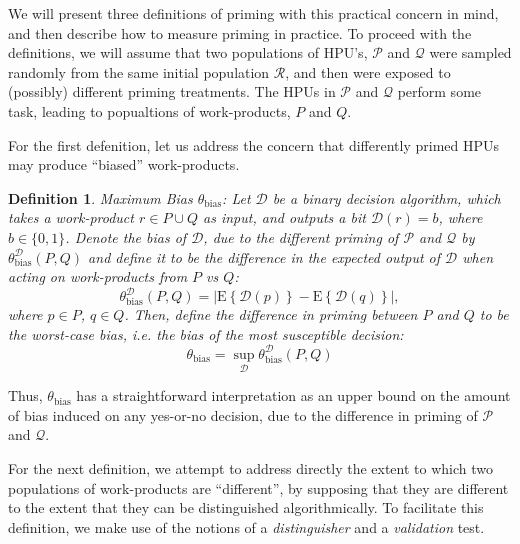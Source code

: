 \documentclass[12pt]{article}
\newtheorem*{mydef}{Definition}
\begin{document}
We will present three definitions of priming with this practical concern in 
mind, and then describe how to measure priming in practice. To proceed with 
the definitions, we will assume that two populations of HPU’s, $\mathcal{P}$ 
and $\mathcal{Q}$ were 
sampled randomly from the same initial population $\mathcal{R}$, and then were 
exposed to (possibly) different priming treatments. The HPUs in $\mathcal{P}$ 
and $\mathcal{Q}$ perform some 
task, leading to popualtions of work-products, $P$ and $Q$.

For the first defenition, let us address the concern that differently primed 
HPUs may produce ``biased'' work-products.

\begin{mydef}
	{\upshape Maximum Bias $\theta_\mathrm{bias}$:}
	Let $\mathcal{D}$ be a binary decision algorithm, which takes a 
	work-product
	$r \in P \cup Q$ as input, and outputs a bit $\mathcal{D}(r)=b$, where 
	$b \in \{0,1\}$. Denote the \emph{bias} of $\mathcal{D}$, due to the
	different priming of $\mathcal{P}$ and $\mathcal{Q}$ by
	$\theta^\mathcal{D}_\mathrm{bias}(P,Q)$ and define it to be the difference 
	in the expected output of $\mathcal{D}$ when acting on work-products from 
	$P$ vs $Q$:
	$$
	\theta^\mathcal{D}_\mathrm{bias}(P,Q) = 
		\left| 
			\mathrm{E}\left\{ \mathcal{D}(p) \right\} 
			- \mathrm{E}\left\{ \mathcal{D}(q) \right\} 
		\right|,
	$$
	where $p \in P$, $q \in Q$.  Then, define the difference in priming 
	between $P$ and $Q$ to be the worst-case bias, i.e. the bias of the most
	susceptible decision:
	$$
	\theta_\mathrm{bias} = 
		\sup_\mathcal{D} \theta^\mathcal{D}_\mathrm{bias}(P,Q)
	$$
\end{mydef}


Thus, $\theta_\mathrm{bias}$ has a straightforward interpretation as an upper 
bound on the amount of bias induced on any yes-or-no decision, due to the 
difference in priming of $\mathcal{P}$ and $\mathcal{Q}$.

For the next definition, we attempt to address directly the extent to which 
two populations of work-products are ``different'', by supposing that they are 
different to the extent that they can be distinguished algorithmically. To 
facilitate this definition, we make use of the notions of a 
\textit{distinguisher} and a \textit{validation} test.
\end{document}
